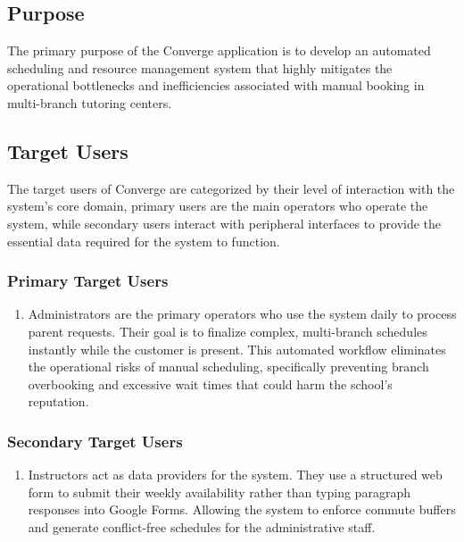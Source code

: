 \subsection{Purpose}
The primary purpose of the Converge application is to develop an automated scheduling and resource management system that highly mitigates the operational bottlenecks and inefficiencies associated with manual booking in multi-branch tutoring centers.

\subsection{Target Users}
The target users of Converge are categorized by their level of interaction with the system's core domain, primary users are the main operators who operate the system, while secondary users interact with peripheral interfaces to provide the essential data required for the system to function.

\subsubsection*{Primary Target Users}
\begin{enumerate}
    \item Administrators are the primary operators who use the system daily to process parent requests. Their goal is to finalize complex, multi-branch schedules instantly while the customer is present. This automated workflow eliminates the operational risks of manual scheduling, specifically preventing branch overbooking and excessive wait times that could harm the school's reputation.
\end{enumerate}

\subsubsection*{Secondary Target Users}
\begin{enumerate}
    \item Instructors act as data providers for the system. They use a structured web form to submit their weekly availability rather than typing paragraph responses into Google Forms. Allowing the system to enforce commute buffers and generate conflict-free schedules for the administrative staff.
\end{enumerate}

